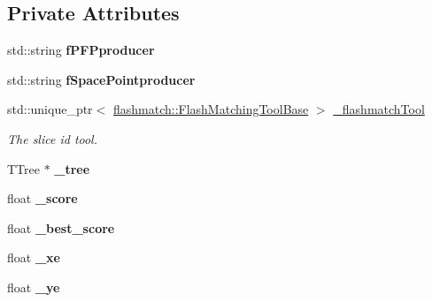 \subsection*{Private Attributes}
\begin{DoxyCompactItemize}
\item 
std\+::string {\bfseries f\+P\+F\+Pproducer}\hypertarget{classCosmicRejection_a032c55a459e56180eb0041033fa3ef34}{}\label{classCosmicRejection_a032c55a459e56180eb0041033fa3ef34}

\item 
std\+::string {\bfseries f\+Space\+Pointproducer}\hypertarget{classCosmicRejection_a8f638302d646f661ce8926cf5442783f}{}\label{classCosmicRejection_a8f638302d646f661ce8926cf5442783f}

\item 
std\+::unique\+\_\+ptr$<$ \hyperlink{classflashmatch_1_1FlashMatchingToolBase}{flashmatch\+::\+Flash\+Matching\+Tool\+Base} $>$ \hyperlink{classCosmicRejection_a89d060de9ac73f2847caf864c6eed691}{\+\_\+flashmatch\+Tool}\hypertarget{classCosmicRejection_a89d060de9ac73f2847caf864c6eed691}{}\label{classCosmicRejection_a89d060de9ac73f2847caf864c6eed691}

\begin{DoxyCompactList}\small\item\em The slice id tool. \end{DoxyCompactList}\item 
T\+Tree $\ast$ {\bfseries \+\_\+tree}\hypertarget{classCosmicRejection_a3c8cc182ac836bfe075b7ff7958dc691}{}\label{classCosmicRejection_a3c8cc182ac836bfe075b7ff7958dc691}

\item 
float {\bfseries \+\_\+score}\hypertarget{classCosmicRejection_a67ae851b53fcd9254bafa834368aacf9}{}\label{classCosmicRejection_a67ae851b53fcd9254bafa834368aacf9}

\item 
float {\bfseries \+\_\+best\+\_\+score}\hypertarget{classCosmicRejection_a2a52872e6ac61b0948c0d6a27f49f827}{}\label{classCosmicRejection_a2a52872e6ac61b0948c0d6a27f49f827}

\item 
float {\bfseries \+\_\+xe}\hypertarget{classCosmicRejection_a33b7e7bb2de6fffbb340b9b061904dca}{}\label{classCosmicRejection_a33b7e7bb2de6fffbb340b9b061904dca}

\item 
float {\bfseries \+\_\+ye}\hypertarget{classCosmicRejection_ac33522cd488a11284d2c1041114842e2}{}\label{classCosmicRejection_ac33522cd488a11284d2c1041114842e2}


\end{DoxyCompactItemize}

